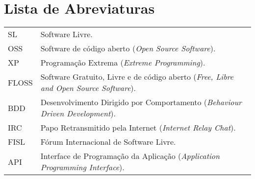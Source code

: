 \documentclass[12pt,twoside,letterpaper]{book}
\begin{document}
\tableofcontents %


\chapter{Lista de Abreviaturas}
\begin{tabular}{ll}
 		SL       & Software Livre.\\
 		OSS         & Software de código aberto (\emph{Open Source Software}).\\
 		XP       & Programação Extrema (\emph{Extreme Programming}).\\
 		FLOSS       & Software Gratuito, Livre e de código aberto (\emph{Free, Libre and Open Source
 Software}).\\
 		BDD       & Desenvolvimento Dirigido por Comportamento (\emph{Behaviour Driven Development}).\\
 		IRC       & Papo Retransmitido pela Internet (\emph{Internet Relay Chat}).\\
 		FISL       & Fórum Internacional de Software Livre.\\
 		API       & Interface de Programação da Aplicação (\emph{Application Programming Interface}).\\
\end{tabular}



\mainmatter

\onehalfspacing              %

\appendix
\end{document}
